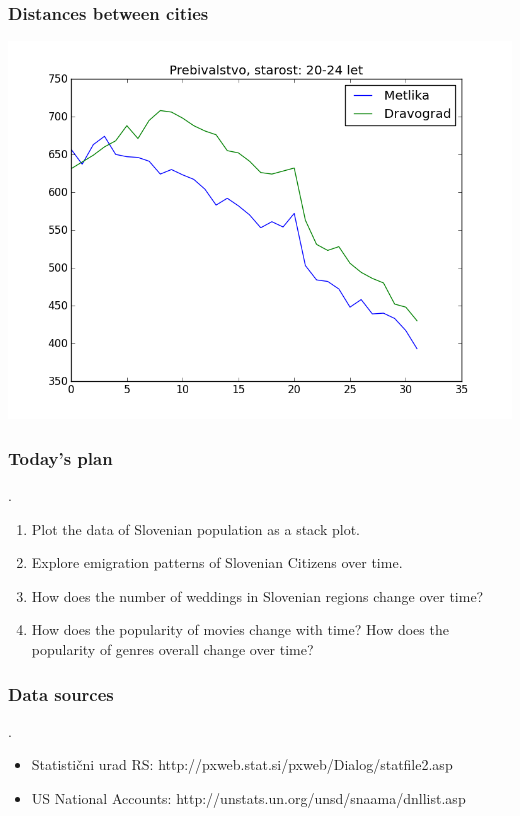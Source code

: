 \documentclass{beamer}
\begin{document}
\begin{frame}
	\frametitle{Distances between cities}
	\includegraphics[scale=0.50]{../results/primerjava_20-24_let.png}
\end{frame} 

\begin{frame}
	\frametitle{Today's plan}.
	\begin{enumerate}
		\item Plot the data of Slovenian population as a stack plot.
		\item Explore emigration patterns of Slovenian Citizens over time. 
		\item How does the number of weddings in Slovenian regions change over time?
		\item How does the popularity of movies change with time? How does the popularity of genres overall change over time?	
	\end{enumerate}
	
\end{frame} 

\begin{frame}
	\frametitle{Data sources}.
	\begin{itemize}
		\item Statistični urad RS: http://pxweb.stat.si/pxweb/Dialog/statfile2.asp
		\item US National Accounts: http://unstats.un.org/unsd/snaama/dnllist.asp
	\end{itemize}
	
\end{frame} 
 
 
\end{document}
